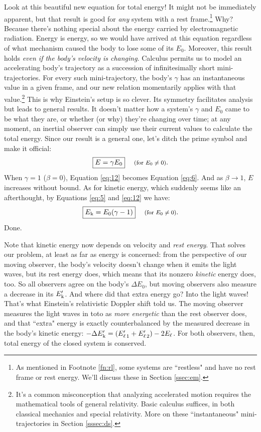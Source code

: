 \documentclass[12pt]{article}
\begin{document}
Look at this beautiful new equation for total energy! It might not be immediately apparent, but that result is good for \emph{any} system with a rest frame.\footnote{As mentioned in Footnote \ref{fn:rl}, some systems are ``restless" and have no rest frame or rest energy. We'll discuss these in Section \ref{ssec:em}.} Why? Because there's nothing special about the energy carried by electromagnetic radiation. Energy is energy, so we would have arrived at this equation regardless of what mechanism caused the body to lose some of its $E_0$. Moreover, this result holds \emph{even if the body's velocity is changing}. Calculus permits us to model an accelerating body's trajectory as a succession of infinitesimally short mini-trajectories. For every such mini-trajectory, the body's $\gamma$ has an instantaneous value in a given frame, and our new relation momentarily applies with that value.\footnote{It's a common misconception that analyzing accelerated motion requires the mathematical tools of general relativity. Basic calculus suffices, in both classical mechanics and special relativity. More on these ``instantaneous" mini-trajectories in Section \ref{sssec:ds}.} This is why Einstein's setup is so clever. Its symmetry facilitates analysis but leads to general results. It doesn't matter how a system's $\gamma$ and $E_0$ came to be what they are, or whether (or why) they're changing over time; at any moment, an inertial observer can simply use their current values to calculate the total energy. Since our result is a general one, let's ditch the prime symbol and make it official:
\begin{equation}\label{eq:12}
\boxed{E = \gamma E_0} \quad \textrm{\footnotesize{ (for $E_0 \neq 0$)}}.
\end{equation}
When $\gamma=1$ ($\beta=0$), Equation \ref{eq:12} becomes Equation \ref{eq:6}. And as $\beta \rightarrow 1$, $E$ increases without bound. As for kinetic energy, which suddenly seems like an afterthought, by Equations \ref{eq:5} and \ref{eq:12} we have:
\begin{equation}\label{eq:13}
\boxed{E_{\mkern.5mu \textrm{k}} = E_0 (\gamma - 1)} \quad \textrm{\footnotesize{ (for $E_0 \neq 0$)}}.
\end{equation}
Done.

Note that kinetic energy now depends on velocity and \emph{rest energy}. That solves our problem, at least as far as energy is concerned: from the perspective of our moving observer, the body's velocity doesn't change when it emits the light waves, but its rest energy does, which means that its nonzero \emph{kinetic} energy does, too. So all observers agree on the body's $\Delta E_0$, but moving observers also measure a decrease in its $E_{\mkern.5mu \textrm{k}}^\prime$. And where did that extra energy go? Into the light waves! That's what Einstein's relativistic Doppler shift told us. The moving observer measures the light waves in toto as \emph{more energetic} than the rest observer does, and that ``extra" energy is exactly counterbalanced by the measured decrease in the body's kinetic energy: $-\Delta E_{\mkern.5mu \textrm{k}}^\prime = (E_{\ell \, 1}^{\prime} + E_{\ell \, 2}^{\prime}) - 2E_{\ell}$. For both observers, then, total energy of the closed system is conserved.
\end{document}
